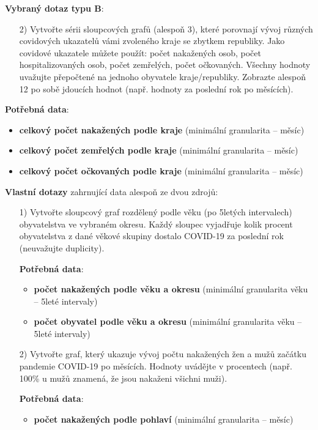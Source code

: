 \documentclass[12pt]{article}
\begin{document}
\hspace{1cm}

\textbf{Vybraný dotaz typu B}:
\begin{itemize}
    \item[2)] Vytvořte sérii sloupcových grafů (alespoň 3), které porovnají vývoj různých covidových ukazatelů vámi zvoleného kraje se zbytkem republiky. Jako covidové ukazatele můžete použít: počet nakažených osob, počet hospitalizovaných osob, počet zemřelých, počet očkovaných. Všechny hodnoty uvažujte přepočtené na jednoho obyvatele kraje/republiky. Zobrazte alespoň 12 po sobě jdoucích hodnot (např. hodnoty za poslední rok po měsících).
\end{itemize}

    \item[] \textbf{Potřebná data}:
    \begin{itemize}
        \item \textbf{celkový počet nakažených podle kraje} (minimální granularita -- měsíc)
        \item \textbf{celkový počet zemřelých podle kraje} (minimální granularita -- měsíc)
        \item \textbf{celkový počet očkovaných podle kraje} (minimální granularita -- měsíc)
    \end{itemize}

\hspace{1cm}

\textbf{Vlastní dotazy} zahrnující data alespoň ze dvou zdrojů:
\begin{itemize}
    \item[1)] Vytvořte sloupcový graf rozdělený podle věku (po 5letých intervalech) obyvatelstva ve vybraném okresu. Každý sloupec vyjadřuje kolik procent obyvatelstva z dané věkové skupiny dostalo COVID-19 za poslední rok (neuvažujte duplicity).

    \item[] \textbf{Potřebná data}:
    \begin{itemize}
        \item \textbf{počet nakažených podle věku a okresu} (minimální granularita věku -- 5leté intervaly)
        \item \textbf{počet obyvatel podle věku a okresu} (minimální granularita věku -- 5leté intervaly)
    \end{itemize}

    \item[2)] Vytvořte graf, který ukazuje vývoj počtu nakažených žen a mužů začátku pandemie COVID-19 po měsících. Hodnoty uvádějte v procentech (např. 100\% u mužů znamená, že jsou nakaženi všichni muži).

    \item[] \textbf{Potřebná data}:
    \begin{itemize}
        \item \textbf{počet nakažených podle pohlaví } (minimální granularita -- měsíc)
    \end{itemize}
\end{itemize}
\end{document}
